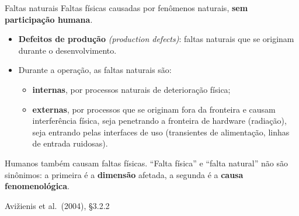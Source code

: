 \documentclass{beamer}
\newcommand{\en}[1]{{\color{depCinza}\textit{#1}}}
\newcommand{\sect}[1]{\par\smallskip\hfill{\tiny\color{black!55}Avi\v{z}ienis et al.\ (2004), #1}}
\begin{document}
\begin{frame}{Faltas naturais}
    \footnotesize
    Faltas f\'isicas causadas por fen\^omenos naturais, \textbf{sem participa\c{c}\~ao humana}.
    \medskip
    \begin{itemize}
        \item \textbf{Defeitos de produ\c{c}\~ao} \en{(production defects)}: faltas naturais que se originam durante o desenvolvimento.
        \item Durante a opera\c{c}\~ao, as faltas naturais s\~ao:
        \begin{itemize}
            \item \textbf{internas}, por processos naturais de deteriora\c{c}\~ao f\'isica;
            \item \textbf{externas}, por processos que se originam fora da fronteira e causam interfer\^encia f\'isica, seja penetrando a fronteira de hardware (radia\c{c}\~ao), seja entrando pelas interfaces de uso (transientes de alimenta\c{c}\~ao, linhas de entrada ruidosas).
        \end{itemize}
    \end{itemize}
    \medskip
    \begin{armadilha}
        \scriptsize
        Humanos tamb\'em causam faltas f\'isicas. ``Falta f\'isica'' e ``falta natural'' n\~ao s\~ao sin\^onimos: a primeira \'e a \textbf{dimens\~ao} afetada, a segunda \'e a \textbf{causa fenomenol\'ogica}.
    \end{armadilha}
    \sect{\S3.2.2}
\end{frame}
\end{document}
